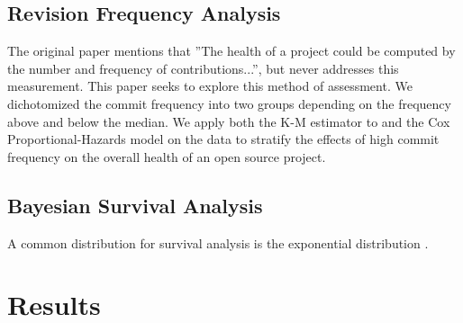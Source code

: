 \documentclass[acmconf]{acmart}
\begin{document}

\subsection{Revision Frequency Analysis}

The original paper mentions that ''The health of a project could be computed by the number and frequency of contributions...'', but never addresses this measurement.
This paper seeks to explore this method of assessment. 
We dichotomized the commit frequency into two groups depending on the frequency above and below the median. 
We apply both the K-M estimator to and the Cox Proportional-Hazards model on the data to stratify the effects of high commit frequency on the overall health of an open source project.


\subsection{Bayesian Survival Analysis}

A common distribution for survival analysis is the exponential distribution \cite{kelter2020bayesian, rethinking}.



\section{Results}
\end{document}
